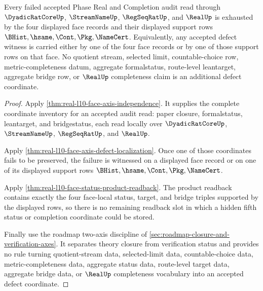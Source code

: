 \begin{theorem}
\label{thm:real-l10-exit-defect-face-completeness}
Every failed accepted Phase Real and Completion audit read through
$\DyadicRatCoreUp$, $\StreamNameUp$, $\RegSeqRatUp$, and $\RealUp$ is exhausted
by the four displayed face records and their displayed support rows
$\BHist,\hsame,\Cont,\Pkg,\NameCert$. Equivalently, any accepted defect witness
is carried either by one of the four face records or by one of those support
rows on that face. No quotient stream, selected limit, countable-choice row,
metric-completeness datum, aggregate formalstatus, route-level leantarget,
aggregate bridge row, or $\RealUp$ completeness claim is an additional defect
coordinate.
\end{theorem}
\begin{proof}
Apply \autoref{thm:real-l10-face-axis-independence}. It supplies the complete
coordinate inventory for an accepted audit read: paper closure, formalstatus,
leantarget, and bridgestatus, each read locally over
$\DyadicRatCoreUp$, $\StreamNameUp$, $\RegSeqRatUp$, and $\RealUp$.

Apply \autoref{thm:real-l10-face-axis-defect-localization}. Once one of those
coordinates fails to be preserved, the failure is witnessed on a displayed
face record or on one of its displayed support rows
$\BHist,\hsame,\Cont,\Pkg,\NameCert$.

Apply \autoref{thm:real-l10-face-status-product-readback}. The product
readback contains exactly the four face-local status, target, and bridge
triples supported by the displayed rows, so there is no remaining readback
slot in which a hidden fifth status or completion coordinate could be stored.

Finally use the roadmap two-axis discipline of
\autoref{sec:roadmap-closure-and-verification-axes}. It separates theory
closure from verification status and provides no rule turning quotient-stream
data, selected-limit data, countable-choice data, metric-completeness data,
aggregate status data, route-level target data, aggregate bridge data, or
$\RealUp$ completeness vocabulary into an accepted defect coordinate.
\end{proof}

